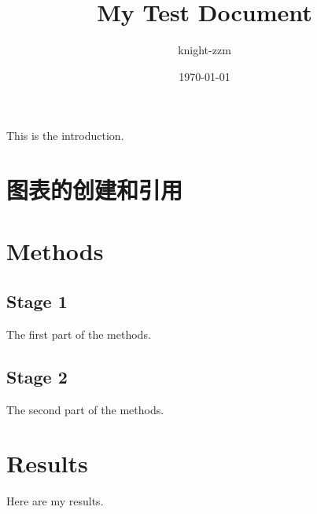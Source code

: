 \documentclass[a4paper,12pt]{report}
\begin{document}
\title{My Test Document}
\author{knight-zzm}
\date{\today}
\maketitle

This is the introduction.

\section{图表的创建和引用}
\section{Methods}

\subsection{Stage 1}
The first part of the methods.

\subsection{Stage 2}
The second part of the methods.

\section{Results}
Here are my results.
\end{document}
